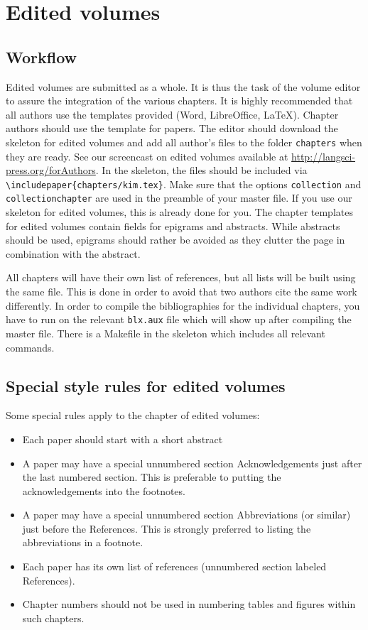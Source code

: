 \chapter{Edited volumes}
\section{Workflow}

Edited volumes are submitted as a whole. It is thus the task of the volume editor to assure the integration of the various chapters. It is highly recommended that all authors use the templates provided (Word, LibreOffice, \LaTeX). 
Chapter authors should use the template for papers. The editor should download the skeleton for edited volumes and add all author's files to the folder \verb+chapters+ when they are ready. See our screencast on edited volumes available at \url{http://langsci-press.org/forAuthors}. In the skeleton, the files should be included via \verb+\includepaper{chapters/kim.tex}+. Make sure that the options \verb+collection+ and \verb+collectionchapter+ are used in the preamble of your master file. If you use our skeleton for edited volumes, this is already done for you. 
The chapter templates for edited volumes contain fields for epigrams and abstracts. While abstracts should be used, epigrams should rather be avoided as they clutter the page in combination with the abstract. 



All chapters will have their own list of references, but all lists will be built using the same {\bibtex} file. This is done in order to avoid that two authors cite the same work differently. In order to compile the bibliographies for the individual chapters, you have to run {\BibTeX} on the relevant \verb+blx.aux+ file which will show up after compiling the master file. There is a Makefile in the skeleton which includes all relevant commands.
     
\section{Special style rules for edited volumes}
Some special rules apply to the chapter of edited volumes:
\begin{itemize}
\item Each paper should start with a short abstract
\item A paper may have a special unnumbered section Acknowledgements just after the last numbered section. This is preferable to putting the acknowledgements into the footnotes.
\item A paper may have a special unnumbered section Abbreviations (or similar) just before the References. This is strongly preferred to listing the abbreviations in a footnote.
\item Each paper has its own list of references (unnumbered section labeled References).
\item Chapter numbers should not be used in numbering tables and figures within such chapters.
\end{itemize}